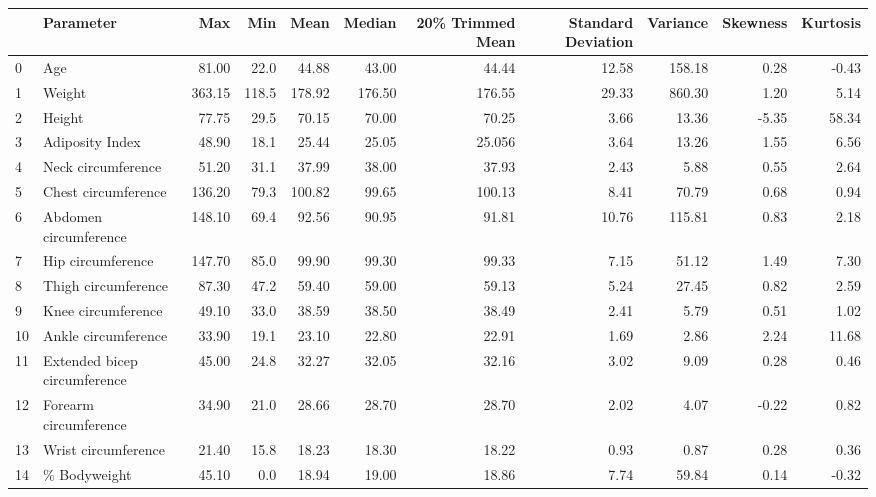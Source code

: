 \begin{tabular}{llrrrrrrrrr}
\toprule
{} &                     Parameter &     Max &    Min &        Mean &  Median &  20\% Trimmed Mean &  Standard Deviation &    Variance &  Skewness &   Kurtosis \\
\midrule
0  &                           Age &   81.00 &   22.0 &   44.88 &   43.00 &         44.44 &           12.58 &  158.18 &  0.28 &  -0.43 \\
1  &                        Weight &  363.15 &  118.5 &  178.92 &  176.50 &        176.55 &           29.33 &  860.30 &  1.20 &   5.14 \\
2  &                        Height &   77.75 &   29.5 &   70.15 &   70.00 &         70.25 &            3.66 &   13.36 & -5.35 &  58.34 \\
3  &               Adiposity Index &   48.90 &   18.1 &   25.44 &   25.05 &         25.056 &            3.64 &   13.26 &  1.55 &   6.56 \\
4  &            Neck circumference &   51.20 &   31.1 &   37.99 &   38.00 &         37.93 &            2.43 &    5.88 &  0.55 &   2.64 \\
5  &           Chest circumference &  136.20 &   79.3 &  100.82 &   99.65 &        100.13 &            8.41 &   70.79 &  0.68 &   0.94 \\
6  &         Abdomen circumference &  148.10 &   69.4 &   92.56 &   90.95 &         91.81 &           10.76 &  115.81 &  0.83 &   2.18 \\
7  &             Hip circumference &  147.70 &   85.0 &   99.90 &   99.30 &         99.33 &            7.15 &   51.12 &  1.49 &   7.30 \\
8  &           Thigh circumference &   87.30 &   47.2 &   59.40 &   59.00 &         59.13 &            5.24 &   27.45 &  0.82 &   2.59 \\
9  &            Knee circumference &   49.10 &   33.0 &   38.59 &   38.50 &         38.49 &            2.41 &    5.79 &  0.51 &   1.02 \\
10 &           Ankle circumference &   33.90 &   19.1 &   23.10 &   22.80 &         22.91 &            1.69 &    2.86 &  2.24 &  11.68 \\
11 &  Extended bicep circumference &   45.00 &   24.8 &   32.27 &   32.05 &         32.16 &            3.02 &    9.09 &  0.28 &   0.46 \\
12 &         Forearm circumference &   34.90 &   21.0 &   28.66 &   28.70 &         28.70 &            2.02 &    4.07 & -0.22 &   0.82 \\
13 &           Wrist circumference &   21.40 &   15.8 &   18.23 &   18.30 &         18.22 &            0.93 &    0.87 &  0.28 &   0.36 \\
14 &                  \% Bodyweight &   45.10 &    0.0 &   18.94 &   19.00 &         18.86 &            7.74 &   59.84 &  0.14 &  -0.32 \\
\bottomrule
\end{tabular}
